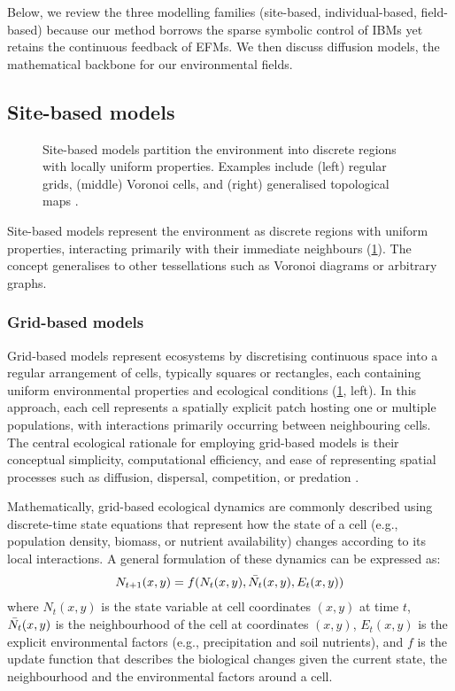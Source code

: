 Below, we review the three modelling families (site-based, individual-based, field-based) because our method borrows the sparse symbolic control of IBMs yet retains the continuous feedback of EFMs. We then discuss diffusion models, the mathematical backbone for our environmental fields.

\subsection{Site-based models}

\begin{figure}
    \caption{Site-based models partition the environment into discrete regions with locally uniform properties. Examples include (left) regular grids, (middle) Voronoi cells, and (right) generalised topological maps \cite{Nelson2012,Lemiere2023}.}
    \label{fig:env-obj-grid-based-models}
\end{figure}

Site-based models represent the environment as discrete regions with uniform properties, interacting primarily with their immediate neighbours (\cref{fig:env-obj-grid-based-models}). The concept generalises to other tessellations such as Voronoi diagrams or arbitrary graphs.

\subsubsection{Grid-based models}

Grid-based models represent ecosystems by discretising continuous space into a regular arrangement of cells, typically squares or rectangles, each containing uniform environmental properties and ecological conditions (\cref{fig:env-obj-grid-based-models}, left). In this approach, each cell represents a spatially explicit patch hosting one or multiple populations, with interactions primarily occurring between neighbouring cells. The central ecological rationale for employing grid-based models is their conceptual simplicity, computational efficiency, and ease of representing spatial processes such as diffusion, dispersal, competition, or predation \cite{Grimm2005,Cantrell2010,Nelson2012}.

Mathematically, grid-based ecological dynamics are commonly described using discrete-time state equations that represent how the state of a cell (e.g., population density, biomass, or nutrient availability) changes according to its local interactions. A general formulation of these dynamics can be expressed as:
\begin{align}
    N_{t+1}(x,y) = f(N_t(x,y), \Bar{N_t}(x, y), E_t(x, y))
\end{align}
where $N_t(x, y)$ is the state variable at cell coordinates $(x, y)$ at time $t$, $\Bar{N_t}(x, y)$ is the neighbourhood of the cell at coordinates $(x, y)$, $E_t(x, y)$ is the explicit environmental factors (e.g., precipitation and soil nutrients), and $f$ is the update function that describes the biological changes given the current state, the neighbourhood and the environmental factors around a cell.

